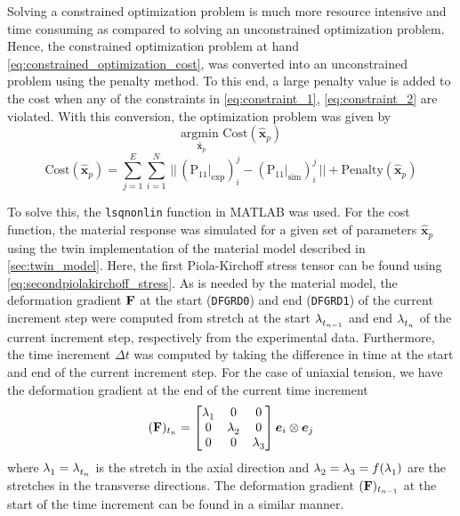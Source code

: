 Solving a constrained optimization problem is much more resource intensive and time consuming as compared to solving an unconstrained optimization problem. Hence, the constrained optimization problem at hand \cref{eq:constrained_optimization_cost}, was converted into an unconstrained problem using the penalty method. To this end, a large penalty value is added to the cost when any of the constraints in \cref{eq:constraint_1}, \cref{eq:constraint_2} are violated. With this conversion, the optimization problem was given by 
\begin{equation*}
    \underset{{\hat{\bm{x}}_p}}{\text{argmin }} \text{Cost}({\hat{\bm{x}}_p})
\end{equation*}
\begin{equation}
    \text{Cost}({\hat{\bm{x}}_p}) = \sum_{j=1}^{E} \sum_{i=1}^{N} \,||\,(\mathrm{P_{11}}{|}_{\text{exp}})^{j}_{i} - (\mathrm{P}_{11}{|}_{\text{sim}})^{j}_{i}\,|| + \text{Penalty}({\hat{\bm{x}}_p})
    \label{eq:unconstrained_optimization}
\end{equation}

To solve this, the \texttt{lsqnonlin} function in MATLAB was used. For the cost function, the material response  was simulated for a given set of parameters \({\hat{\bm{x}}_p}\) using the twin implementation of the material model described in \cref{sec:twin_model}. Here, the first Piola-Kirchoff stress tensor can be found using \cref{eq:secondpiolakirchoff_stress}. As is needed by the material model, the deformation gradient \(\mathbf{F}{}\) at the start (\texttt{DFGRD0}) and end (\texttt{DFGRD1}) of the current increment step were computed from stretch at the start \(\lambda^{}_{{t_{n-1}}}\) and end \(\lambda^{}_{{t_{n}}}\) of the current increment step, respectively from the experimental data. Furthermore, the time increment \(\Delta t\) was computed by taking the difference in time at the start and end of the current increment step. For the case of uniaxial tension, we have the deformation gradient at the end of the current time increment 
\begin{equation}
    (\mathbf{F})_{t_{n}} = 
    \begin{bmatrix}
    \lambda^{}_{{1}} & 0 & 0 \\
    0 & \lambda^{}_{{2}} & 0\\
    0 & 0 & \lambda^{}_{{3}}
    \end{bmatrix} \bm{e}_{i} \otimes \bm{e}_{j}
\end{equation}
where \(\lambda^{}_{{1}} = \lambda^{}_{{t_{n}}}\) is the stretch in the axial direction and \(\lambda^{}_{{2}} = \lambda^{}_{{3}} = f({\lambda^{}_{{1}}})\) are the stretches in the transverse directions. The deformation gradient \((\mathbf{F})_{t_{n-1}}\) at the start of the time increment can be found in a similar manner.


